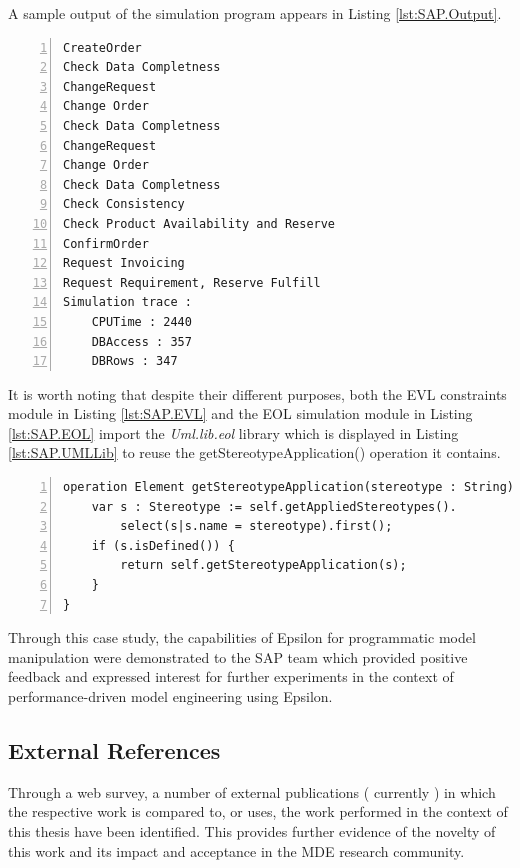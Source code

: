 A sample output of the simulation program appears in Listing \ref{lst:SAP.Output}.

\begin{lstlisting}[basicstyle=\ttfamily\footnotesize, flexiblecolumns=true, numbers=left, nolol=true, caption=Sample output of the simulation program of Listing \ref{lst:SAP.EOL}, label=lst:SAP.Output, tabsize=2]
CreateOrder
Check Data Completness
ChangeRequest
Change Order
Check Data Completness
ChangeRequest
Change Order
Check Data Completness
Check Consistency
Check Product Availability and Reserve
ConfirmOrder
Request Invoicing
Request Requirement, Reserve Fulfill
Simulation trace : 
	CPUTime : 2440
	DBAccess : 357
	DBRows : 347
\end{lstlisting}

It is worth noting that despite their different purposes, both the EVL constraints module in Listing \ref{lst:SAP.EVL} and the EOL simulation module in Listing \ref{lst:SAP.EOL} import the \emph{Uml.lib.eol} library which is displayed in Listing \ref{lst:SAP.UMLLib} to reuse the getStereotypeApplication() operation it contains.

\begin{lstlisting}[basicstyle=\ttfamily\footnotesize, flexiblecolumns=true, numbers=left, nolol=true, caption=The shared Uml.lib.eol library, label=lst:SAP.UMLLib, language=EOL, tabsize=2]
operation Element getStereotypeApplication(stereotype : String) {
	var s : Stereotype := self.getAppliedStereotypes().
		select(s|s.name = stereotype).first();
	if (s.isDefined()) {
		return self.getStereotypeApplication(s);
	}
}
\end{lstlisting}

Through this case study, the capabilities of Epsilon for programmatic model manipulation were demonstrated to the SAP team which provided positive feedback and expressed interest for further experiments in the context of performance-driven model engineering using Epsilon.

\subsection{External References}

Through a web survey, a number of external publications ( currently \cite{Zito2006,Langlois2006,Queralt2006,Boronat2006,Conmy2006,Karlsch2006,Eessaar2006,Costa2007,MinimalOCL,AlgebraicView,CrosscuttingMT,FeatureOriented,Weise2007,Pons08,Brauer2007,Rubin2008,VORA,Markovic2008,BrauerThesis,Reiter22007,Pons2007,Lazar2007,ReiterPetri2007,Zamani2007,Jeanneret2008}) in which the respective work is compared to, or uses, the work performed in the context of this thesis have been identified. This provides further evidence of the novelty of this work and its impact and acceptance in the MDE research community.

